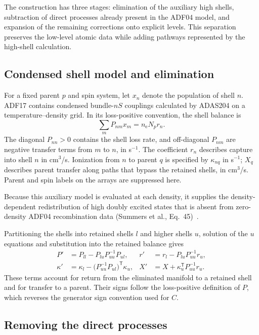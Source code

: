 \documentclass[11pt,a4paper]{article}
\newcommand{\nelec}{n_{\mathrm e}}
\numberwithin{equation}{section}
\begin{document}
The construction has three stages: elimination of the auxiliary high
shells, subtraction of direct processes already present in the ADF04
model, and expansion of the remaining corrections onto explicit
levels. This separation preserves the low-level atomic data while
adding pathways represented by the high-shell calculation.

\subsection{Condensed shell model and elimination}

For a fixed parent $p$ and spin system, let $x_n$ denote the population
of shell $n$. ADF17 contains condensed bundle-$nS$ couplings calculated
by ADAS204 on a temperature--density grid. In its loss-positive
convention, the shell balance is
\begin{equation}\label{eq:bundle}
 \sum_m P_{nm}x_m=\nelec N_p r_n.
\end{equation}
The diagonal $P_{nn}>0$ contains the shell loss rate, and off-diagonal
$P_{nm}$ are negative transfer terms from $m$ to $n$, in s$^{-1}$.
The coefficient $r_n$ describes capture into shell $n$ in cm$^3$/s.
Ionization from $n$ to parent $q$ is specified by $\kappa_{nq}$ in
s$^{-1}$; $X_q$ describes parent transfer along paths that bypass
the retained shells, in cm$^3$/s. Parent and spin labels on the arrays
are suppressed here.

Because this auxiliary model is evaluated at each density, it supplies
the density-dependent redistribution of high doubly excited states
that is absent from zero-density ADF04 recombination data (Summers
et al., Eq.~45)~\cite{summers2006}.

Partitioning the shells into retained shells $l$ and higher shells
$u$, solution of the $u$ equations and substitution into the retained
balance gives
\begin{align}
 P'&=P_{ll}-P_{lu}P_{uu}^{-1}P_{ul}, &
 r'&=r_l-P_{lu}P_{uu}^{-1}r_u,\\
 \kappa'&=\kappa_l-\bigl(P_{uu}^{-1}P_{ul}\bigr)^{\mathsf T}\kappa_u, &
 X'&=X+\kappa_u^{\mathsf T}P_{uu}^{-1}r_u.
\end{align}
These terms account for return from the eliminated manifold to a
retained shell and for transfer to a parent. Their signs follow the
loss-positive definition of $P$, which reverses the generator sign
convention used for $C$.

\subsection{Removing the direct processes}
\end{document}
